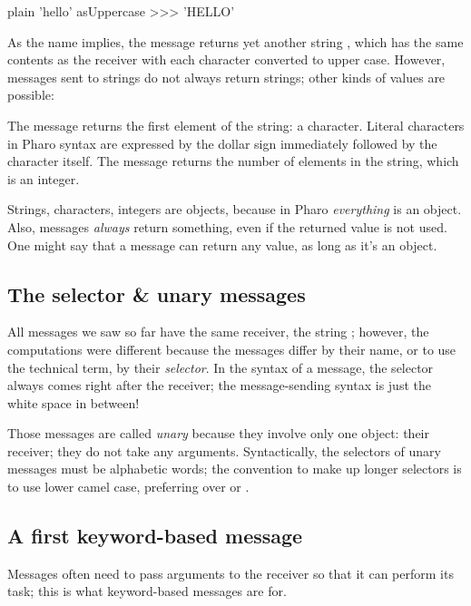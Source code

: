 \documentclass[10pt,twoside,english]{_support/latex/sbabook/sbabook}
\begin{document}
\begin{displaycode}{plain}
'hello' asUppercase
>>> 'HELLO'
\end{displaycode}

As the name implies, the  message returns yet another string , which has the same contents as the receiver with each character converted to upper case.
However, messages sent to strings do not always return strings; other kinds of values are possible:


The message  returns the first element of the string: a character.
Literal characters in Pharo syntax are expressed by the dollar sign \textcode{\$} immediately followed by the character itself.
The message  returns the number of elements in the string, which is an integer.

Strings, characters, integers are objects, because in Pharo \textit{everything} is an object.
Also, messages \textit{always} return something, even if the returned value is not used.
One might say that a message can return any value, as long as it's an object.
\subsection{The selector \& unary messages}
All messages we saw so far have the same receiver, the string ; however, the computations were different because the messages differ by their name, or to use the technical term, by their \textit{selector}.
In the syntax of a message, the selector always comes right after the receiver; the message-sending syntax is just the white space in between!

Those messages are called \textit{unary} because they involve only one object: their receiver; they do not take any arguments.
Syntactically, the selectors of unary messages must be alphabetic words; the convention to make up longer selectors is to use lower camel case, preferring  over  or .
\subsection{A first keyword-based message}
Messages often need to pass arguments to the receiver so that it can perform its task; this is what keyword-based messages are for.
\end{document}
